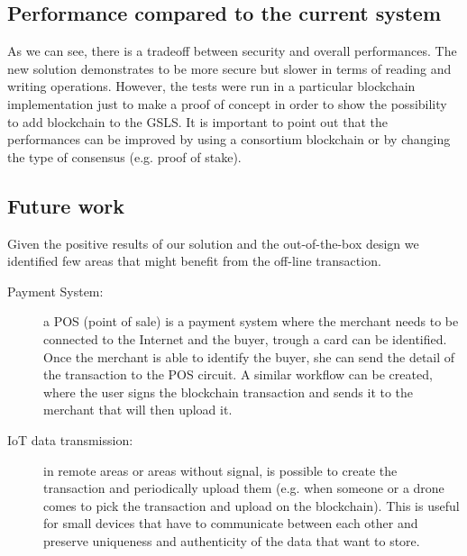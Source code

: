 \subsection{Performance compared to the current system}

As we can see, there is a tradeoff between security and overall performances. The new solution demonstrates to be more secure but slower in terms of reading and writing operations. However, the tests were run in a particular blockchain implementation just to make a proof of concept in order to show the possibility to add blockchain to the GSLS. It is important to point out that the performances can be improved by using a consortium blockchain or by changing the type of consensus (e.g. proof of stake).

\subsection{Future work}

Given the positive results of our solution and the out-of-the-box design we identified few areas that might benefit from the off-line transaction.

\begin{description}
    
    \item[Payment System:] a POS (point of sale) is a payment system where the merchant needs to be connected to the Internet and the buyer, trough a card can be identified. Once the merchant is able to identify the buyer, she can send the detail of the transaction to the POS circuit.
    A similar workflow can be created, where the user signs the blockchain transaction and sends it to the merchant that will then upload it.

    \item[IoT data transmission:] in remote areas or areas without signal, is possible to create the transaction and periodically upload them (e.g. when someone or a drone comes to pick the transaction and upload on the blockchain). This is useful for small devices that have to communicate between each other and preserve uniqueness and authenticity of the data that want to store.
    
\end{description}
